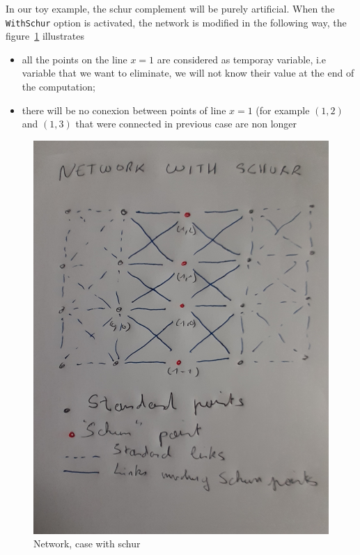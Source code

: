 In our toy example, the schur complement will be purely artificial. When the
{\tt WithSchur}  option is activated, the network is modified in the following
way, the figure~\ref{fig:NetSchur} illustrates 

\begin{itemize}
    \item all the points on the line $x=1$ are considered as temporay variable,
          i.e variable that we want to eliminate, we will not  know their value at the
          end of the computation; 

    \item there will be no conexion between points of line $x=1$ (for example $(1,2)$
          and $(1,3)$ that were connected in previous case are non longer
\end{itemize}

\begin{figure}
\centering
\includegraphics[width=12cm]{Methods/Images/T90-NetSchur.JPG}\caption{Network, case with schur}\label{fig:NetSchur}
\end{figure}


